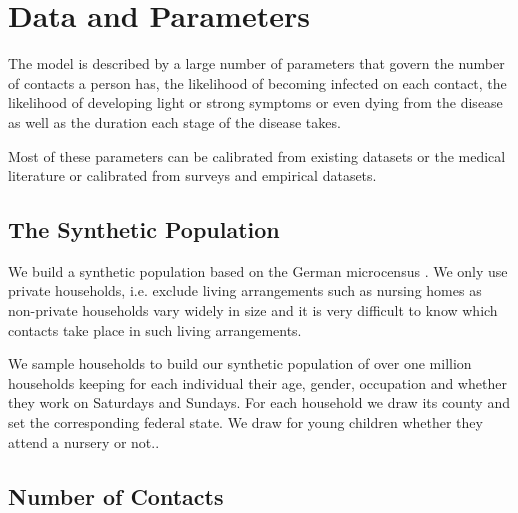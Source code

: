\section{Data and Parameters}
\label{sec:data_and_parameters}

The model is described by a large number of parameters that govern the number of
contacts a person has, the likelihood of becoming infected on each contact, the
likelihood of developing light or strong symptoms or even dying from the disease as well
as the duration each stage of the disease takes.

Most of these parameters can be calibrated from existing datasets or the medical
literature or calibrated from surveys and empirical datasets.



\FloatBarrier

\subsection{The Synthetic Population}

We build a synthetic population based on the German microcensus \citep{FDSAeDBUDL2018}.
We only use private households, i.e. exclude living arrangements such as nursing homes as
non-private households vary widely in size and it is very difficult to know which
contacts take place in such living arrangements.

We sample households to build our synthetic population of over one million households
keeping for each individual their age, gender, occupation and whether they work on
Saturdays and Sundays. For each household we draw its county and set the corresponding
federal state.%
We draw for young children whether they attend a nursery or
not.\citep{Destatis2020}.

\FloatBarrier


\subsection{Number of Contacts}
\label{sub:number_of_contacts}

